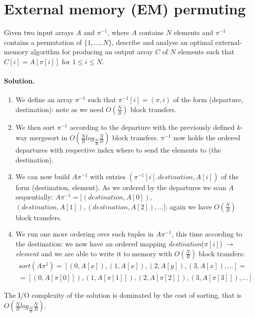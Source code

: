 \section{External memory (EM) permuting}
Given two input arrays $A$ and $\pi^{-1}$, where $A$ contains $N$ elements and $\pi^{-1}$ contains a permutation of $\{1, \dots, N\}$, describe and analyse an optimal external-memory algorithm for producing an output array $C$ of $N$ elements such that $C[i] = A[\pi[i]]$ for $1 \leq i \leq N$.

\vspace{0.5cm}
\paragraph{Solution.}
\begin{enumerate}
	\item We define an array $\pi^{-1}$ such that $\pi^{-1}[i] = (\pi, i)$ of the form (departure, destination): note as we need $O(\frac{N}{B})$ block transfers.
	\item We then sort $\pi^{-1}$ according to the departure with the previously defined $k$-way mergesort in $O(\frac{N}{B} log_{\frac{M}{B}} \frac{N}{B})$ block transfers. $\pi^{-1}$ now holds the ordered departures with respective index where to send the elements to (the destination).
	\item We can now build $A\pi^{-1}$ with entries $(\pi^{-1}[i].destination, A[i])$ of the form (destination, element).
	As we ordered by the departures we scan $A$ sequentially: $A\pi^{-1} = [(destination, A[0]),$ \\$(destination, A[1]), (destination, A[2]), \dots]$: again we have $O(\frac{N}{B})$ block transfers.
	\item We run one more ordering over such tuples in $A\pi^{-1}$, this time according to the destination: we now have an ordered mapping \emph{destination}($\pi[i]$) $\to$ \emph{element} and we are able to write it to memory with $O(\frac{N}{B})$ block transfers:
	\begin{gather*}
	  sort(A\pi^{1}) = [(0, A[x]), (1, A[x]), (2, A[y]), (3, A[x]), \dots ] = \\
	  = [(0, A[\pi[0]]), (1, A[\pi[1]]), (2, A[\pi[2]]), (3, A[\pi[3]]), \dots ] 
	\end{gather*}
\end{enumerate}
The I/O complexity of the solution is dominated by the cost of sorting, that is $O(\frac{N}{B} log_{\frac{M}{B}} \frac{N}{B})$.